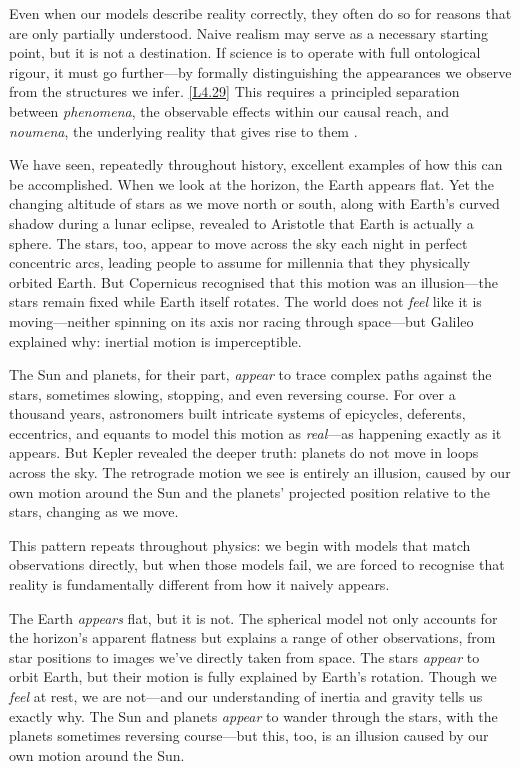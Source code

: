 \documentclass[12pt]{book}
\newcounter{logicanchor}
\newenvironment{logicanchorenv}[1]{\refstepcounter{logicanchor}\label{#1}}{}
\newcommand{\logiclink}[2]{\begin{logicanchorenv}{logic:#1}\end{logicanchorenv}\hyperref[appendix:#1]{[#1]}\xspace}
\begin{document}
Even when our models describe reality correctly, they often do so for reasons that are only partially understood. Naive realism may serve as a necessary starting point, but it is not a destination. If science is to operate with full ontological rigour, it must go further---by formally distinguishing the appearances we observe from the structures we infer. \logiclink{L4.29}{} This requires a principled separation between \textit{phenomena}, the observable effects within our causal reach, and \textit{noumena}, the underlying reality that gives rise to them \citep{Maudlin2007}.

We have seen, repeatedly throughout history, excellent examples of how this can be accomplished. When we look at the horizon, the Earth appears flat. Yet the changing altitude of stars as we move north or south, along with Earth's curved shadow during a lunar eclipse, revealed to Aristotle that Earth is actually a sphere. The stars, too, appear to move across the sky each night in perfect concentric arcs, leading people to assume for millennia that they physically orbited Earth. But Copernicus recognised that this motion was an illusion---the stars remain fixed while Earth itself rotates. The world does not \textit{feel} like it is moving---neither spinning on its axis nor racing through space---but Galileo explained why: inertial motion is imperceptible.

The Sun and planets, for their part, \textit{appear} to trace complex paths against the stars, sometimes slowing, stopping, and even reversing course. For over a thousand years, astronomers built intricate systems of epicycles, deferents, eccentrics, and equants to model this motion as \textit{real}---as happening exactly as it appears. But Kepler revealed the deeper truth: planets do not move in loops across the sky. The retrograde motion we see is entirely an illusion, caused by our own motion around the Sun and the planets' projected position relative to the stars, changing as we move.

This pattern repeats throughout physics: we begin with models that match observations directly, but when those models fail, we are forced to recognise that reality is fundamentally different from how it naively appears.

The Earth \textit{appears} flat, but it is not. The spherical model not only accounts for the horizon's apparent flatness but explains a range of other observations, from star positions to images we've directly taken from space. The stars \textit{appear} to orbit Earth, but their motion is fully explained by Earth's rotation. Though we \textit{feel} at rest, we are not---and our understanding of inertia and gravity tells us exactly why. The Sun and planets \textit{appear} to wander through the stars, with the planets sometimes reversing course---but this, too, is an illusion caused by our own motion around the Sun. 
\end{document}

